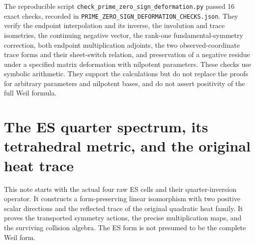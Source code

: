 \documentclass[
  10pt,
  a4paper,
]{article}
\begin{document}
The reproducible script
\texttt{check\_\allowbreak{}prime\_\allowbreak{}zero\_\allowbreak{}sign\_\allowbreak{}deformation.\allowbreak{}py} passed 16 exact
checks, recorded in
\texttt{PRIME\_\allowbreak{}ZERO\_\allowbreak{}SIGN\_\allowbreak{}DEFORMATION\_\allowbreak{}CHECKS.\allowbreak{}json}. They verify the
endpoint interpolation and its inverse, the involution and trace
isometries, the continuing negative vector, the rank-one
fundamental-symmetry correction, both endpoint multiplication adjoints,
the two observed-coordinate trace forms and their sheet-switch relation,
and preservation of a negative residue under a specified matrix
deformation with nilpotent parameters. These checks use symbolic
arithmetic. They support the calculations but do not replace the proofs
for arbitrary parameters and nilpotent bases, and do not assert
positivity of the full Weil formula.

\clearpage

\section{The ES quarter spectrum, its tetrahedral metric, and the
original heat
trace}\label{the-es-quarter-spectrum-its-tetrahedral-metric-and-the-original-heat-trace}

This note starts with the actual four raw ES cells and their
quarter-inversion operator. It constructs a form-preserving linear
isomorphism with two positive scalar directions and the reflected trace
of the original quadratic heat family. It proves the transported
symmetry actions, the precise multiplication maps, and the surviving
collision algebra. The ES form is not presumed to be the complete Weil
form.
\end{document}

